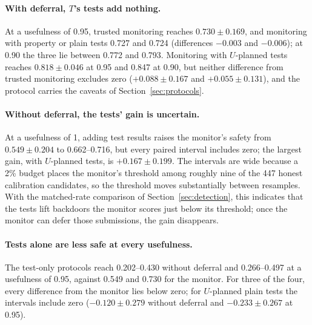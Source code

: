\paragraph{With deferral, $T$'s tests add nothing.} At a usefulness of 0.95, trusted monitoring
reaches $0.730 \pm 0.169$, and monitoring with property or plain tests 0.727 and 0.724 (differences
$-0.003$ and $-0.006$); at 0.90 the three lie between 0.772 and 0.793. Monitoring with $U$-planned
tests reaches $0.818 \pm 0.046$ at 0.95 and 0.847 at 0.90, but neither difference from trusted
monitoring excludes zero ($+0.088 \pm 0.167$ and $+0.055 \pm 0.131$), and the protocol carries the
caveats of Section~\ref{sec:protocols}.

\paragraph{Without deferral, the tests' gain is uncertain.} At a usefulness of 1, adding test
results raises the monitor's safety from $0.549 \pm 0.204$ to 0.662--0.716, but every paired
interval includes zero; the largest gain, with $U$-planned tests, is $+0.167 \pm 0.199$. The
intervals are wide because a 2\% budget places the monitor's threshold among roughly nine of the
447 honest calibration candidates, so the threshold moves substantially between resamples. With the
matched-rate comparison of Section~\ref{sec:detection}, this indicates that the tests lift
backdoors the monitor scores just below its threshold; once the monitor can defer those
submissions, the gain disappears.

\paragraph{Tests alone are less safe at every usefulness.} The test-only protocols reach
0.202--0.430 without deferral and 0.266--0.497 at a usefulness of 0.95, against 0.549 and 0.730 for
the monitor. For three of the four, every difference from the monitor lies below zero; for
$U$-planned plain tests the intervals include zero ($-0.120 \pm 0.279$ without deferral and
$-0.233 \pm 0.267$ at 0.95).

